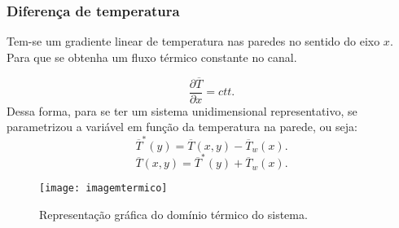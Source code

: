 \documentclass[xcolor=dvipsnames,10pt,aspectratio=169]{beamer}
\begin{document}
	
	
	
		\begin{frame}
			\frametitle{Diferença de temperatura}
			Tem-se um gradiente linear de temperatura nas paredes no sentido do eixo $x$. Para que se obtenha um fluxo térmico constante no canal.  \\
			\begin{minipage}[h!]{0.36\textwidth}
				\begin{equation}
				\frac{\partial \overline{T}}{\partial x} = ctt.
				\end{equation}
				Dessa forma, para se ter um sistema unidimensional representativo, se parametrizou a variável em função da temperatura na parede, ou seja:
				\begin{equation}
				\overline{T}^\ast(y) = \overline{T}(x,y)  - \overline{T}_w(x) .
				\end{equation}
				\begin{equation}
				\overline{T}(x,y) = \overline{T}^\ast(y) + \overline{T}_w(x).
				\end{equation}
			\end{minipage}\hfill
			\begin{minipage}[h!]{0.60\textwidth}
			\begin{figure}
				\centering
				\texttt{[image: imagemtermico]}
				\caption{Representação gráfica do domínio térmico do sistema.}
				\label{temperatura}
			\end{figure}
			\end{minipage}
		\end{frame}
		
		
		
		
		
\end{document}
